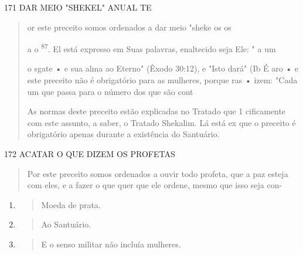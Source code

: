 171 DAR MEIO "SHEKEL" ANUAL TE

\begin{quote}
or este preceito somos ordenados a dar meio "sheke os os

a o \textsuperscript{87}. El está expresso em Suas palavras, enaltecido
seja Ele: " a um

o sgate • e sua alma ao Eterno" (Êxodo 30:12), e "Isto dará" (Ib É aro •
e este preceito não é obrigatório para as mulheres, porque ras • izem:
"Cada um que passa para o número dos que são cont

As normas deste preceito estão explicadas no Tratado que 1 cificamente
com este assunto, a saber, o Tratado Shekalim. Lá está ex que o preceito
é obrigatório apenas durante a existência do Santuário.
\end{quote}

172 ACATAR O QUE DIZEM OS PROFETAS

\begin{quote}
Por este preceito somos ordenados a ouvir todo profeta, que a paz esteja
com eles, e a fazer o que quer que ele ordene, mesmo que isso seja con-
\end{quote}

\begin{enumerate}
\def\labelenumi{\arabic{enumi}.}
\setcounter{enumi}{185}
\item
  \begin{quote}
  Moeda de prata.
  \end{quote}
\item
  \begin{quote}
  Ao Santuário.
  \end{quote}
\item
  \begin{quote}
  E o senso militar não incluía mulheres.
  \end{quote}
\end{enumerate}

